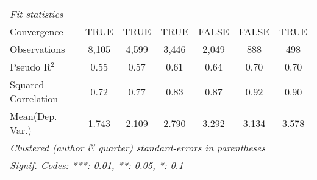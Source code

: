 \begin{tabular}{lcccccc}
   \midrule
   \emph{Fit statistics}\\
   Convergence                                                &TRUE           & TRUE          & TRUE         & FALSE         & FALSE   & TRUE\\  
   Observations                                               & 8,105         & 4,599         & 3,446        & 2,049         & 888     & 498\\  
   Pseudo R$^2$                                               & 0.55          & 0.57          & 0.61         & 0.64          & 0.70    & 0.70\\  
   Squared Correlation                                        & 0.72          & 0.77          & 0.83         & 0.87          & 0.92    & 0.90\\  
Mean(Dep. Var.) & 1.743 & 2.109 & 2.790 & 3.292 & 3.134 & 3.578 \\
   \midrule \midrule
   \multicolumn{7}{l}{\emph{Clustered (author \& quarter) standard-errors in parentheses}}\\
   \multicolumn{7}{l}{\emph{Signif. Codes: ***: 0.01, **: 0.05, *: 0.1}}\\
\end{tabular}
\par\endgroup
